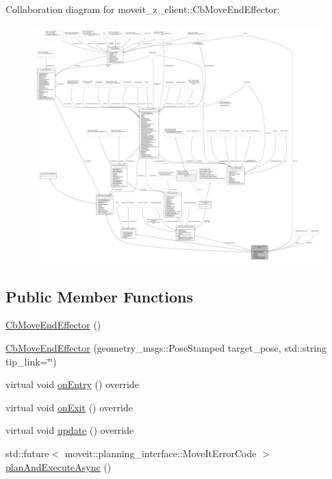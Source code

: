 Collaboration diagram for moveit\+\_\+z\+\_\+client\+:\+:Cb\+Move\+End\+Effector\+:
\nopagebreak
\begin{figure}[H]
\begin{center}
\leavevmode
\includegraphics[width=350pt]{classmoveit__z__client_1_1CbMoveEndEffector__coll__graph}
\end{center}
\end{figure}
\subsection*{Public Member Functions}
\begin{DoxyCompactItemize}
\item 
\hyperlink{classmoveit__z__client_1_1CbMoveEndEffector_acd25310b5088e3eeaa75220d283546e8}{Cb\+Move\+End\+Effector} ()
\item 
\hyperlink{classmoveit__z__client_1_1CbMoveEndEffector_a688d63425a7a67c3f26d1ae90733ccb1}{Cb\+Move\+End\+Effector} (geometry\+\_\+msgs\+::\+Pose\+Stamped target\+\_\+pose, std\+::string tip\+\_\+link=\char`\"{}\char`\"{})
\item 
virtual void \hyperlink{classmoveit__z__client_1_1CbMoveEndEffector_a5306018b432c9d8f8a31823f6b317d84}{on\+Entry} () override
\item 
virtual void \hyperlink{classmoveit__z__client_1_1CbMoveEndEffector_af3fdc6c596da7792cfc9bbef13cb02fc}{on\+Exit} () override
\item 
virtual void \hyperlink{classmoveit__z__client_1_1CbMoveEndEffector_a09d13b5736a13a811f474b48c6ad43cf}{update} () override
\item 
std\+::future$<$ moveit\+::planning\+\_\+interface\+::\+Move\+It\+Error\+Code $>$ \hyperlink{classmoveit__z__client_1_1CbMoveEndEffector_a4e039996326fc2133085439fee860dde}{plan\+And\+Execute\+Async} ()
\end{DoxyCompactItemize}
